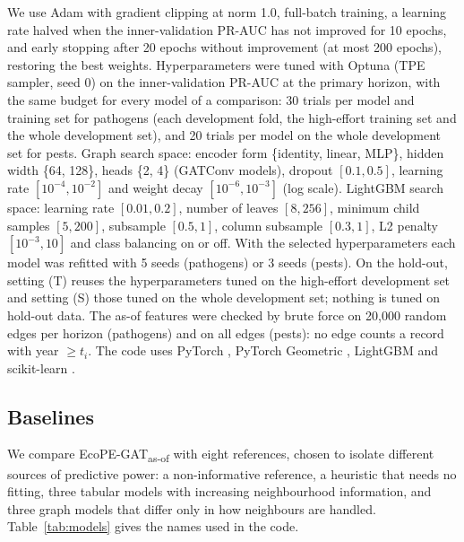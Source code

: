 \documentclass[a4paper,fleqn]{cas-sc}
\newcommand{\Masof}{\mbox{EcoPE-GAT\textsubscript{as-of}}}
\begin{document}
We use Adam \citep{kingma2015} with gradient clipping at norm 1.0, full-batch training, a learning rate halved when the inner-validation PR-AUC has not improved for 10 epochs, and early stopping after 20 epochs without improvement (at most 200 epochs), restoring the best weights. Hyperparameters were tuned with Optuna \citep{akiba2019} (TPE sampler, seed 0) on the inner-validation PR-AUC at the primary horizon, with the same budget for every model of a comparison: 30 trials per model and training set for pathogens (each development fold, the high-effort training set and the whole development set), and 20 trials per model on the whole development set for pests. Graph search space: encoder form \{identity, linear, MLP\}, hidden width \{64, 128\}, heads \{2, 4\} (GATConv models), dropout $[0.1, 0.5]$, learning rate $[10^{-4}, 10^{-2}]$ and weight decay $[10^{-6}, 10^{-3}]$ (log scale). LightGBM \citep{ke2017} search space: learning rate $[0.01, 0.2]$, number of leaves $[8, 256]$, minimum child samples $[5, 200]$, subsample $[0.5, 1]$, column subsample $[0.3, 1]$, L2 penalty $[10^{-3}, 10]$ and class balancing on or off. With the selected hyperparameters each model was refitted with 5 seeds (pathogens) or 3 seeds (pests). On the hold-out, setting (T) reuses the hyperparameters tuned on the high-effort development set and setting (S) those tuned on the whole development set; nothing is tuned on hold-out data. The as-of features were checked by brute force on 20{,}000 random edges per horizon (pathogens) and on all edges (pests): no edge counts a record with year $\geq t_i$. The code uses PyTorch \citep{paszke2019}, PyTorch Geometric \citep{fey2019}, LightGBM and scikit-learn \citep{pedregosa2011}.

\subsection{Baselines}
\label{sec:baselines}

We compare \Masof{} with eight references, chosen to isolate different sources of predictive power: a non-informative reference, a heuristic that needs no fitting, three tabular models with increasing neighbourhood information, and three graph models that differ only in how neighbours are handled. Table~\ref{tab:models} gives the names used in the code.
\end{document}
